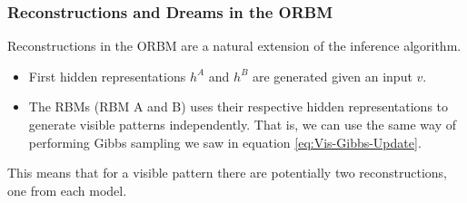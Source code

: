 

%
%
\subsubsection{Reconstructions and Dreams in the ORBM}

Reconstructions in the ORBM are a natural extension of the inference algorithm.
\begin{itemize}
  \item First hidden representations $h^A$ and $ h^B $ are generated given an input $v$.
  \item The RBMs (RBM A and B) uses their respective hidden representations to generate visible patterns independently. That is, we can use the same way of performing Gibbs sampling we saw in equation \ref{eq:Vis-Gibbs-Update}.
\end{itemize}
This means that for a visible pattern there are potentially two reconstructions, one from each model.
